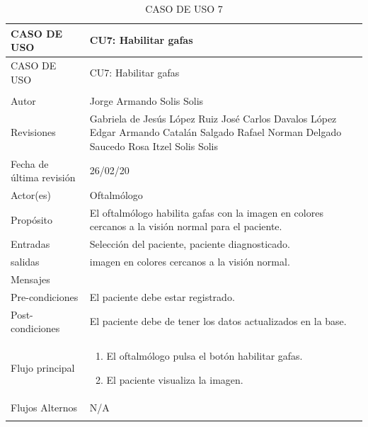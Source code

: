 \documentclass[10pt]{article}
\begin{document}
\begin{longtable}{|p{3.8cm}|p{10.8cm}|}
\hline
CASO DE USO & CU7: Habilitar gafas\\
\hline 
\endfirsthead

\hline

CASO DE USO & CU7: Habilitar gafas\\
\hline 
\endhead

\multicolumn{2}{c}{}
\endfoot

\endlastfoot
\hline
versión & 1\\
\hline
Autor & Jorge Armando Solis Solis\\
\hline
Revisiones & Gabriela de Jesús López Ruiz\newline
José Carlos Davalos López\newline
Edgar Armando Catalán Salgado\newline
Rafael Norman Delgado Saucedo\newline
Rosa Itzel Solis Solis
\\

\hline
Fecha de última revisión & 26/02/20\\
\hline
Actor(es) & Oftalmólogo \\
\hline
Propósito & El oftalmólogo habilita gafas con la imagen en colores cercanos a la visión normal para el paciente.\\
\hline
Entradas & Selección del paciente, paciente diagnosticado.\\
\hline
salidas & imagen en colores cercanos a la visión normal.\\
\hline
Mensajes & \\
\hline
Pre-condiciones & El paciente debe estar registrado.\\
\hline
Post-condiciones & El paciente debe de tener los datos actualizados en la base.\\
\hline
Flujo principal & \begin{enumerate}
    \item El oftalmólogo pulsa el botón habilitar gafas.
    \item El paciente visualiza la imagen.
\end{enumerate}
    \\
\hline
Flujos Alternos &  N/A\\
\hline
\caption{CASO DE USO 7}
\label{tabla1}
\end{longtable}
\end{document}
